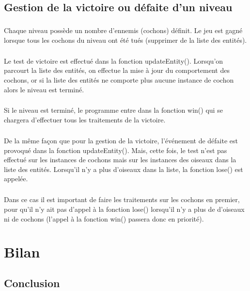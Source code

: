 \documentclass[a4paper,12pt]{report}
\begin{document}
\section{Gestion de la victoire ou défaite d'un niveau}

\paragraph{}Chaque niveau possède un nombre d’ennemis (cochons) définit. Le jeu est gagné lorsque tous les cochons du niveau ont été tués (supprimer de la liste des entités).
\paragraph{}Le test de victoire est effectué dans la fonction updateEntity(). Lorsqu'on parcourt la liste des entités, on effectue la mise à jour du comportement des cochons, or si la liste des entités ne comporte plus aucune instance de cochon alors le niveau est terminé. 
\paragraph{}Si le niveau est terminé, le programme entre dans la fonction win() qui se chargera d'effectuer tous les traitements de la victoire.
\paragraph{}De la même façon que pour la gestion de la victoire, l'événement de défaite est provoqué dans la fonction updateEntity(). Mais, cette fois, le test n'est pas effectué sur les instances de cochons mais sur les instances des oiseaux dans la liste des entités. Lorsqu'il n'y a plus d'oiseaux dans la liste, la fonction lose() est appelée.
\paragraph{}Dans ce cas il est important de faire les traitements sur les cochons en premier, pour qu'il n'y ait pas d'appel à la fonction lose() lorsqu'il n'y a plus de d'oiseaux ni de cochons (l'appel à la fonction win() passera donc en priorité).

\chapter{Bilan}
\section{Conclusion}
\end{document}

